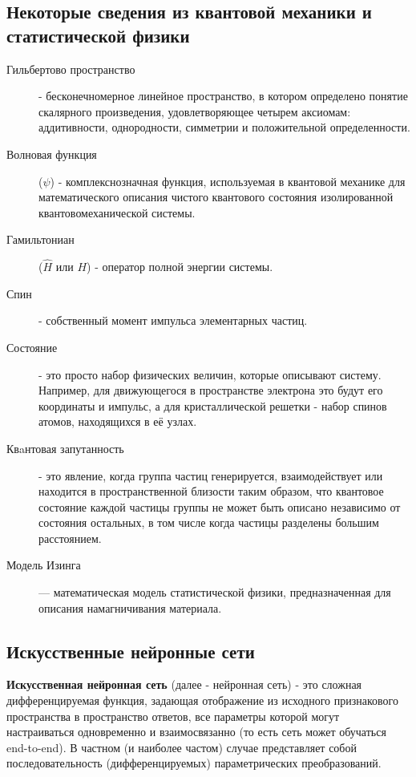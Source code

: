 \subsection{Некоторые сведения из квантовой механики и статистической физики}
\vspace{0.5cm}
\begin{description}
  \item[Гильбертово пространство] - бесконечномерное линейное пространство, в котором определено понятие скалярного произведения, удовлетворяющее четырем аксиомам: аддитивности, однородности, симметрии и положительной определенности.
  \item[Волновая функция] (\( \psi \)) - комплекснозначная функция, используемая в квантовой механике для математического описания чистого квантового состояния изолированной квантовомеханической системы.
  \item[Гамильтониан] (\( \hat{H} \) или \( H \)) - оператор полной энергии системы.
  \item[Спин] - собственный момент импульса элементарных частиц.
  \item[Состояние] - это просто набор физических величин, которые описывают систему. Например, для движующегося в пространстве электрона это будут его координаты и импульс, а для кристаллической решетки - набор спинов атомов, находящихся в её узлах.
  \item[Квaнтовая запутанность] - это явление, когда группа частиц генерируется, взаимодействует или находится в пространственной близости таким образом, что квантовое состояние каждой частицы группы не может быть описано независимо от состояния остальных, в том числе когда частицы разделены большим расстоянием.
  \item[Модель Изинга] — математическая модель статистической физики, предназначенная для описания намагничивания материала.


\end{description}



\subsection{Искусственные нейронные сети}
\vspace{0.5cm}

\hspace{0.5cm} \textbf{Искусственная нейронная сеть} (далее - нейронная сеть) - это сложная дифференцируемая функция, задающая отображение из исходного признакового пространства в пространство ответов, все параметры которой могут настраиваться одновременно и взаимосвязанно (то есть сеть может обучаться end-to-end). В частном (и наиболее частом) случае представляет собой последовательность (дифференцируемых) параметрических преобразований.

